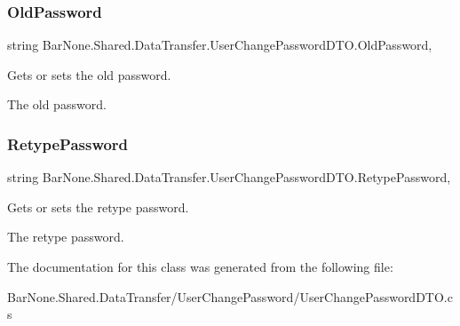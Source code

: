 \subsubsection{\texorpdfstring{Old\+Password}{OldPassword}}
{\footnotesize\ttfamily string Bar\+None.\+Shared.\+Data\+Transfer.\+User\+Change\+Password\+D\+T\+O.\+Old\+Password\hspace{0.3cm}{\ttfamily [get]}, {\ttfamily [set]}}



Gets or sets the old password. 

The old password. \mbox{\label{class_bar_none_1_1_shared_1_1_data_transfer_1_1_user_change_password_d_t_o_aa3e4a2c9aa3eec45a2df1ef95415995b}} 
\subsubsection{\texorpdfstring{Retype\+Password}{RetypePassword}}
{\footnotesize\ttfamily string Bar\+None.\+Shared.\+Data\+Transfer.\+User\+Change\+Password\+D\+T\+O.\+Retype\+Password\hspace{0.3cm}{\ttfamily [get]}, {\ttfamily [set]}}



Gets or sets the retype password. 

The retype password. 

The documentation for this class was generated from the following file\+:\begin{DoxyCompactItemize}
\item 
Bar\+None.\+Shared.\+Data\+Transfer/\+User\+Change\+Password/User\+Change\+Password\+D\+T\+O.\+cs\end{DoxyCompactItemize}
